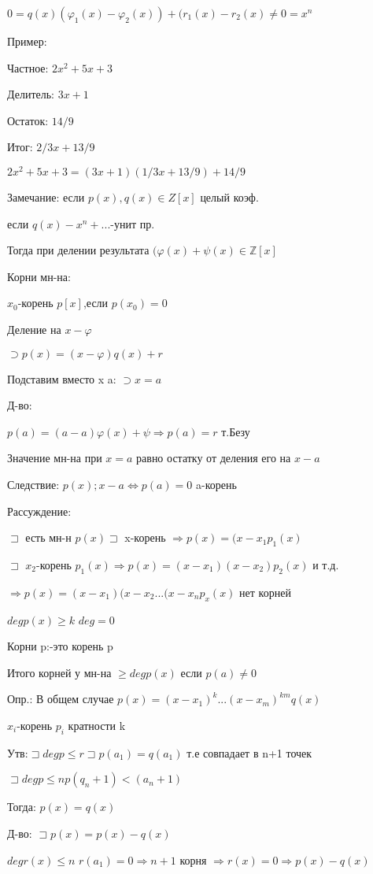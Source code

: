 \documentclass{article}
\begin{document}
$0=q(x)(\varphi_{1}(x)-\varphi_{2}(x))+(r_{1}(x)-r_{2}(x)\ne0=x^n$

Пример:

Частное: $2x^2+5x+3$

Делитель: $3x+1$

Остаток: $14/9$

Итог: $2/3x+13/9$

$2x^2+5x+3=(3x+1)(1/3x+13/9)+14/9$

Замечание: если $p(x),q(x) \in Z[x]$ целый коэф.

если $q(x)-x^n+...$-унит пр.

Тогда при делении результата $(\varphi(x)+\psi(x)\in \mathds{Z}[x] $

Корни мн-на:

$x_{0}$-корень $p[x]$,если $p(x_{0})=0$

Деление на $x-\varphi$

$\supset p(x)=(x-\varphi)q(x)+r$

Подставим вместо x a: $\supset x=a $

Д-во:

$p(a)=(a-a)\varphi(x)+\psi\Longrightarrow p(a)=r$ т.Безу

Значение мн-на при $x=a$ равно остатку от деления его на $x-a$

Следствие: $p(x);x-a\Leftrightarrow p(a)=0$ a-корень 

Рассуждение:

$\sqsupset$ есть мн-н $p(x)\sqsupset$ x-корень $\Longrightarrow p(x)=(x-x_{1}p_{1}(x)$

$\sqsupset$ $x_{2}$-корень $p_{1}(x)\Longrightarrow p(x)=(x-x_{1})(x-x_{2})p_{2}(x)$ и т.д.

$\Longrightarrow p(x)=(x-x_{1})(x-x_{2}...(x-x_{n}p_{x}(x)$ нет корней 

$degp(x)\geqslant k$ $deg=0$

Корни  p:-это корень p

Итого корней у мн-на $\geqslant deg p(x)$ если $p(a)\ne0$

Опр.: В общем случае $p(x)=(x-x_{1})^k...(x-x_{m})^{km}q(x)$

$x_{i}$-корень $p_{i}$ кратности k

Утв:$\sqsupset degp\leqslant r \sqsupset p(a_{1})=q(a_{1})$ т.е совпадает в n+1 точек

$\sqsupset degp\leqslant n p(q_{n}+1) < (a_{n}+1)$

Тогда: $p(x)=q(x)$

Д-во: $\sqsupset p(x)=p(x)-q(x)$

$degr(x)\leqslant n$ $r(a_{1})=0 \Longrightarrow n+1$ корня $\Longrightarrow r(x)=0\Longrightarrow p(x)-q(x)$
\end{document}
